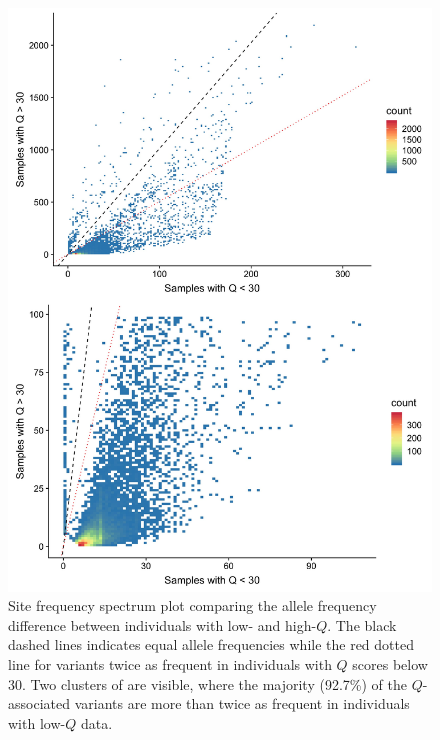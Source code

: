 \documentclass[9pt,lineno]{template}
\begin{document}
\begin{figure}[h]
\centering
\includegraphics[width=15cm,keepaspectratio]{../Figures/OverUnder30.jpg}
\caption{Site frequency spectrum plot comparing the allele frequency difference between individuals with low- and high-$Q$. The black dashed lines indicates equal allele frequencies while the red dotted line for variants twice as frequent in individuals with $Q$ scores below 30. Two clusters of are visible, where the majority (92.7\%) of the $Q$-associated variants are more than twice as frequent in individuals with low-$Q$ data.}  
\label{90HanSFS_full}
\end{figure}
\end{document}

